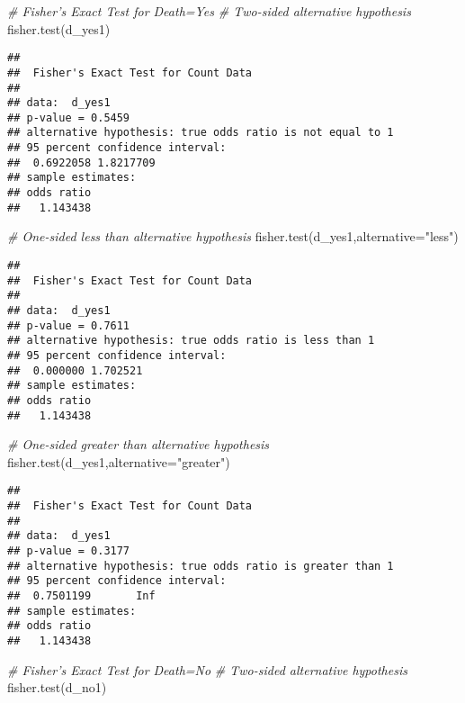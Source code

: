 \documentclass[
]{article}
\newenvironment{Shaded}{\begin{snugshade}}{\end{snugshade}}
\newcommand{\AttributeTok}[1]{\textcolor[rgb]{0.77,0.63,0.00}{#1}}
\newcommand{\CommentTok}[1]{\textcolor[rgb]{0.56,0.35,0.01}{\textit{#1}}}
\newcommand{\FunctionTok}[1]{\textcolor[rgb]{0.00,0.00,0.00}{#1}}
\newcommand{\NormalTok}[1]{#1}
\newcommand{\StringTok}[1]{\textcolor[rgb]{0.31,0.60,0.02}{#1}}
\begin{document}
\begin{Shaded}
\begin{Highlighting}[]
\CommentTok{\# Fisher’s Exact Test for Death=Yes}
\CommentTok{\# Two{-}sided alternative hypothesis}
\FunctionTok{fisher.test}\NormalTok{(d\_yes1)}
\end{Highlighting}
\end{Shaded}

\begin{verbatim}
## 
##  Fisher's Exact Test for Count Data
## 
## data:  d_yes1
## p-value = 0.5459
## alternative hypothesis: true odds ratio is not equal to 1
## 95 percent confidence interval:
##  0.6922058 1.8217709
## sample estimates:
## odds ratio 
##   1.143438
\end{verbatim}

\begin{Shaded}
\begin{Highlighting}[]
\CommentTok{\# One{-}sided less than alternative hypothesis}
\FunctionTok{fisher.test}\NormalTok{(d\_yes1,}\AttributeTok{alternative=}\StringTok{"less"}\NormalTok{)}
\end{Highlighting}
\end{Shaded}

\begin{verbatim}
## 
##  Fisher's Exact Test for Count Data
## 
## data:  d_yes1
## p-value = 0.7611
## alternative hypothesis: true odds ratio is less than 1
## 95 percent confidence interval:
##  0.000000 1.702521
## sample estimates:
## odds ratio 
##   1.143438
\end{verbatim}

\begin{Shaded}
\begin{Highlighting}[]
\CommentTok{\# One{-}sided greater than alternative hypothesis}
\FunctionTok{fisher.test}\NormalTok{(d\_yes1,}\AttributeTok{alternative=}\StringTok{"greater"}\NormalTok{)}
\end{Highlighting}
\end{Shaded}

\begin{verbatim}
## 
##  Fisher's Exact Test for Count Data
## 
## data:  d_yes1
## p-value = 0.3177
## alternative hypothesis: true odds ratio is greater than 1
## 95 percent confidence interval:
##  0.7501199       Inf
## sample estimates:
## odds ratio 
##   1.143438
\end{verbatim}

\begin{Shaded}
\begin{Highlighting}[]
\CommentTok{\# Fisher’s Exact Test for Death=No}
\CommentTok{\# Two{-}sided alternative hypothesis}
\FunctionTok{fisher.test}\NormalTok{(d\_no1)}
\end{Highlighting}
\end{Shaded}
\end{document}
